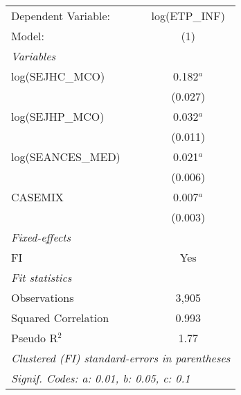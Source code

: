 
\begingroup
\centering
\begin{tabular}{lc}
   \tabularnewline \midrule \midrule
   Dependent Variable: & log(ETP\_INF)\\   
   Model:              & (1)\\  
   \midrule
   \emph{Variables}\\
   log(SEJHC\_MCO)     & 0.182$^{a}$\\   
                       & (0.027)\\   
   log(SEJHP\_MCO)     & 0.032$^{a}$\\   
                       & (0.011)\\   
   log(SEANCES\_MED)   & 0.021$^{a}$\\   
                       & (0.006)\\   
   CASEMIX             & 0.007$^{a}$\\   
                       & (0.003)\\   
   \midrule
   \emph{Fixed-effects}\\
   FI                  & Yes\\  
   \midrule
   \emph{Fit statistics}\\
   Observations        & 3,905\\  
   Squared Correlation & 0.993\\  
   Pseudo R$^2$        & 1.77\\  
   \midrule \midrule
   \multicolumn{2}{l}{\emph{Clustered (FI) standard-errors in parentheses}}\\
   \multicolumn{2}{l}{\emph{Signif. Codes: a: 0.01, b: 0.05, c: 0.1}}\\
\end{tabular}
\par\endgroup


